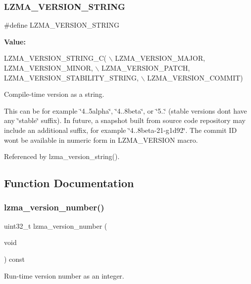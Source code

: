\subsubsection{L\+Z\+M\+A\+\_\+\+V\+E\+R\+S\+I\+O\+N\+\_\+\+S\+T\+R\+I\+NG}
{\footnotesize\ttfamily \#define L\+Z\+M\+A\+\_\+\+V\+E\+R\+S\+I\+O\+N\+\_\+\+S\+T\+R\+I\+NG}

{\bfseries Value\+:}
\begin{DoxyCode}
LZMA\_VERSION\_STRING\_C( \(\backslash\)
                LZMA\_VERSION\_MAJOR, LZMA\_VERSION\_MINOR, \(\backslash\)
                LZMA\_VERSION\_PATCH, LZMA\_VERSION\_STABILITY\_STRING, \(\backslash\)
                LZMA\_VERSION\_COMMIT)
\end{DoxyCode}


Compile-\/time version as a string. 

This can be for example \char`\"{}4..\+5alpha\char`\"{}, \char`\"{}4..\+8beta\char`\"{}, or \char`\"{}5..\char`\"{} (stable versions don\textquotesingle{}t have any \char`\"{}stable\char`\"{} suffix). In future, a snapshot built from source code repository may include an additional suffix, for example \char`\"{}4..\+8beta-\/21-\/g1d92\char`\"{}. The commit ID won\textquotesingle{}t be available in numeric form in L\+Z\+M\+A\+\_\+\+V\+E\+R\+S\+I\+ON macro. 

Referenced by lzma\+\_\+version\+\_\+string().



\subsection{Function Documentation}
\mbox{\label{version_8h_a72f929c9b9e8e730b790b3f8c80c3c80}} 
\subsubsection{lzma\+\_\+version\+\_\+number()}
{\footnotesize\ttfamily uint32\+\_\+t lzma\+\_\+version\+\_\+number (\begin{DoxyParamCaption}\item[{void}]{ }\end{DoxyParamCaption}) const}



Run-\/time version number as an integer. 

